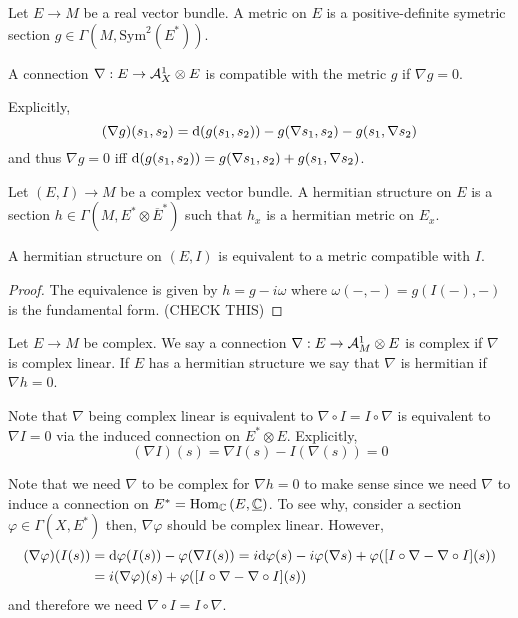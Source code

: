 \documentclass[12pt]{article}
\begin{document}
\begin{defn}
Let $E \to M$ be a real vector bundle. A metric on $E$ is a positive-definite symetric section $g \in \Gamma(M, \mathrm{Sym}^2(E^*))$.
\end{defn}

\begin{defn}
A connection $\nabla : E \to \mathcal{A}^1_X \otimes E$ is compatible with the metric $g$ if $\nabla g = 0$. 
\end{defn}

\begin{rmk}
Explicitly, 
\[ (\nabla g)(s_1, s_2) = \mathrm{d}{(g(s_1, s_2))} - g(\nabla s_1, s_2) - g(s_1, \nabla s_2) \]
and thus $\nabla g = 0$ iff $\mathrm{d}{(g(s_1, s_2))} = g(\nabla s_1, s_2) + g(s_1, \nabla s_2)$.
\end{rmk}

\begin{defn}
Let $(E, I) \to M$ be a complex vector bundle. A hermitian structure on $E$ is a section $h \in \Gamma(M, E^* \otimes \overline{E}^*)$ such that $h_x$ is a hermitian metric on $E_x$.
\end{defn}

\begin{prop}
A hermitian structure on $(E, I)$ is equivalent to a metric compatible with $I$.
\end{prop}

\begin{proof}
The equivalence is given by $h = g - i \omega$ where $\omega(-,-) = g(I(-),-)$ is the fundamental form. (CHECK THIS)
\end{proof}

\begin{defn}
Let $E \to M$ be complex. We say a connection $\nabla : E \to \mathcal{A}^1_M \otimes E$ is complex if $\nabla$ is complex linear. If $E$ has a hermitian structure we say that $\nabla$ is hermitian if $\nabla h = 0$.
\end{defn}

\begin{rmk}
Note that $\nabla$ being complex linear is equivalent to $\nabla \circ I = I \circ \nabla$ is equivalent to $\nabla I = 0$ via the induced connection on $E^* \otimes E$. Explicitly,
\[ (\nabla I)(s) = \nabla I(s) - I(\nabla(s)) = 0 \]
\end{rmk}

\begin{rmk}
Note that we need $\nabla$ to be complex for $\nabla h = 0$ to make sense since we need $\nabla$ to induce a connection on $E^* = \mathrm{Hom}_{\mathbb{C}} \left( E, \underline{\mathbb{C}} \right)$. To see why, consider a section $\varphi \in \Gamma(X, E^*)$ then, $\nabla \varphi$ should be complex linear. However,
\begin{align*}
(\nabla \varphi)(I(s)) & = \mathrm{d}{\varphi(I(s))} - \varphi(\nabla I(s)) = i \mathrm{d}{\varphi(s)} - i \varphi(\nabla s) + \varphi([I \circ \nabla - \nabla \circ I](s))
\\
& = i (\nabla \varphi)(s) + \varphi([I \circ \nabla - \nabla \circ I](s))
\end{align*}
and therefore we need $\nabla \circ I = I \circ \nabla$.
\end{rmk}
\end{document}
